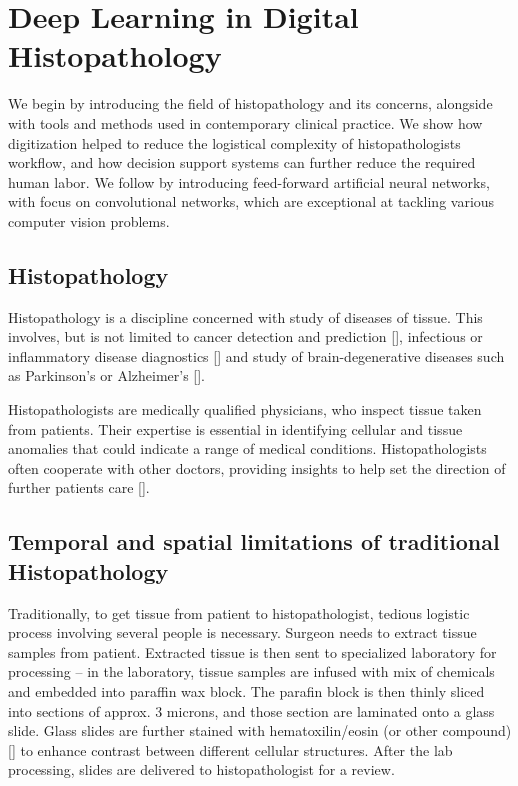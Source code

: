 \chapter{Deep Learning in Digital Histopathology}

We begin by introducing the field of histopathology and its concerns, alongside with tools and methods used in contemporary clinical practice.
We show how digitization helped to reduce the logistical complexity of histopathologists workflow, and how decision support systems can further reduce the required human labor.
We follow by introducing feed-forward artificial neural networks, with focus on convolutional networks, which are exceptional at tackling various computer vision problems.

\section{Histopathology}

Histopathology is a discipline concerned with study of diseases of tissue.
This involves, but is not limited to cancer detection and prediction [], infectious or inflammatory disease diagnostics [] and study of brain-degenerative diseases such as Parkinson's or Alzheimer's [].

Histopathologists are medically qualified physicians, who inspect tissue taken from patients.
Their expertise is essential in identifying cellular and tissue anomalies that could indicate a range of medical conditions.
Histopathologists often cooperate with other doctors, providing insights to help set the direction of further patients care [].

\section{Temporal and spatial limitations of traditional Histopathology}

Traditionally, to get tissue from patient to histopathologist, tedious logistic process involving several people is necessary.
Surgeon needs to extract tissue samples from patient.
Extracted tissue is then sent to specialized laboratory for processing -- in the laboratory, tissue samples are infused with mix of chemicals and embedded into paraffin wax block.
The parafin block is then thinly sliced into sections of approx. $3$ microns, and those section are laminated onto a glass slide.
Glass slides are further stained with hematoxilin/eosin (or other compound) [] to enhance contrast between different cellular structures.
After the lab processing, slides are delivered to histopathologist for a review.

